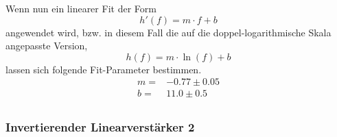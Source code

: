 Wenn nun ein linearer Fit der Form 
\begin{equation*}
    h'(f)=m\cdot f+b
\end{equation*}
angewendet wird, bzw. in diesem Fall die auf die doppel-logarithmische Skala angepasste Version, 
\begin{equation*}
    h(f)= m \cdot \ln\left({f}\right) + b
\end{equation*}
lassen sich folgende Fit-Parameter bestimmen.
\begin{align*}
    m=&-0.77\pm 0.05 \\
    b=& 11.0\pm 0.5\\
\end{align*}


\subsubsection{Invertierender Linearverstärker 2}
\label{sec:InvertierenderLinearverstärker2}


